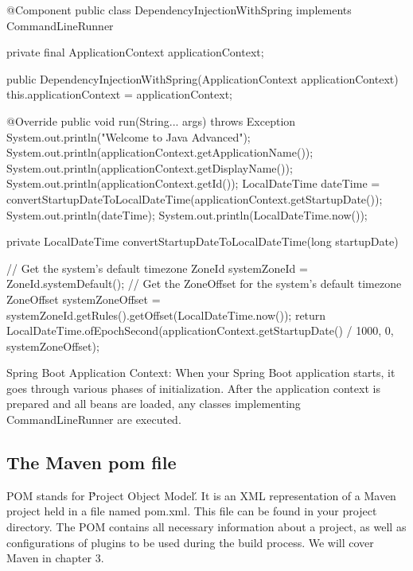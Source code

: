 @Component
public class DependencyInjectionWithSpring implements CommandLineRunner {
	private final ApplicationContext applicationContext;

	public DependencyInjectionWithSpring(ApplicationContext applicationContext) {
		this.applicationContext = applicationContext;
	}

	@Override
   public void run(String... args) throws Exception {
	   System.out.println("Welcome to Java Advanced");
		System.out.println(applicationContext.getApplicationName());
		System.out.println(applicationContext.getDisplayName());
		System.out.println(applicationContext.getId());
		LocalDateTime dateTime = convertStartupDateToLocalDateTime(applicationContext.getStartupDate());
		System.out.println(dateTime);
		System.out.println(LocalDateTime.now());
   }


   private LocalDateTime convertStartupDateToLocalDateTime(long startupDate) {
	   // Get the system's default timezone
	   ZoneId systemZoneId = ZoneId.systemDefault();
	   // Get the ZoneOffset for the system's default timezone
	   ZoneOffset systemZoneOffset = systemZoneId.getRules().getOffset(LocalDateTime.now());
		return LocalDateTime.ofEpochSecond(applicationContext.getStartupDate() / 1000, 0, systemZoneOffset);

   }
}



Spring Boot Application Context:
When your Spring Boot application starts, it goes through various phases of initialization. After the application context is prepared and all beans are loaded, any classes implementing CommandLineRunner are executed.

\subsection{The Maven pom file}

POM stands for \'Project Object Model\'. It is an XML representation of a Maven project held in a file named pom.xml. This file can be found in your project directory. The POM contains all necessary information about a project, as well as configurations of plugins to be used during the build process. We will cover Maven in chapter 3.

